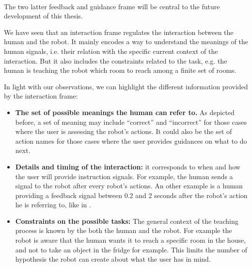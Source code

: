 \paragraph{} The two latter feedback and guidance frame will be central to the future development of this thesis. 

\transition

We have seen that an interaction frame regulates the interaction between the human and the robot. It mainly encodes a way to understand the meanings of the human signals, i.e. their relation with the specific current context of the interaction. But it also includes the constraints related to the task, e.g. the human is teaching the robot which room to reach among a finite set of rooms.

In light with our observations, we can highlight the different information provided by the interaction frame:

\begin{itemize}

\item \textbf{The set of possible meanings the human can refer to.} As depicted before, a set of meaning may include ``correct'' and ``incorrect'' for those cases where the user is assessing the robot's actions. It could also be the set of action names for those cases where the user provides guidances on what to do next.

\item \textbf{Details and timing of the interaction:} it corresponds to when and how the user will provide instruction signals. For example, the human sends a signal to the robot after every robot's actions. An other example is a human providing a feedback signal between 0.2 and 2 seconds after the robot's action he is referring to, like in \cite{knox2009interactively}.

\item \textbf{Constraints on the possible tasks:} The general context of the teaching process is known by the both the human and the robot. For example the robot is aware that the human wants it to reach a specific room in the house, and not to take an object in the fridge for example. This limits the number of hypothesis the robot can create about what the user has in mind.

\end{itemize}

